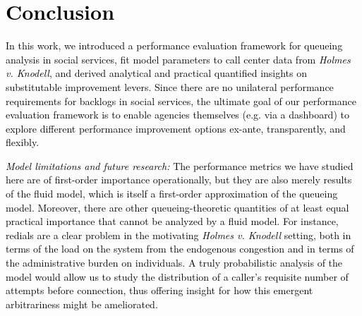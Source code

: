 \documentclass[manuscript,screen,authorversion]{acmart}
\newcommand{\rev}[1]{\textcolor{black}{#1}}
\begin{document}
\section{\rev{Conclusion}}

\rev{In this work, we introduced a performance evaluation framework for queueing analysis in social services, fit model parameters to call center data from \textit{Holmes v. Knodell}, and derived analytical and practical quantified insights on substitutable improvement levers. 
Since there are no unilateral performance requirements for backlogs in social services, the ultimate goal of our performance evaluation framework is to enable agencies themselves (e.g. via a dashboard) to explore different performance improvement options ex-ante, transparently, and flexibly. %
}


\rev{\textit{Model limitations and future research: } 
The performance metrics we have studied here are of first-order importance operationally, but they are also merely results of the fluid model, which is itself a first-order approximation of the queueing model. Moreover, there are other queueing-theoretic quantities of at least equal practical importance
that cannot be analyzed by a fluid model. For instance, redials are a clear problem in the motivating \emph{Holmes v. Knodell} setting, both in terms of the load on the system from the endogenous congestion and in terms of the administrative burden on individuals. 
A truly probabilistic analysis of the model would allow us to study the distribution of a caller's requisite number of attempts before connection, thus offering insight for how this  emergent arbitrariness might be ameliorated.
}


\end{document}
